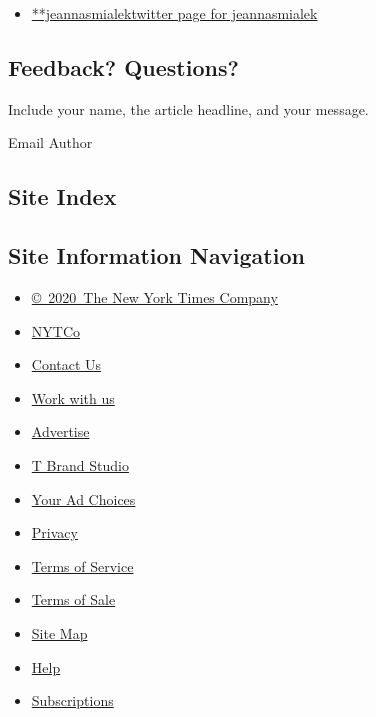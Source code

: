 \begin{itemize}
\tightlist
\item
  \href{https://twitter.com/jeannasmialek}{**jeannasmialektwitter page
  for jeannasmialek}
\end{itemize}

\hypertarget{feedback-questions}{%
\subsection{Feedback? Questions?}\label{feedback-questions}}

Include your name, the article headline, and your message.

Email Author

\hypertarget{site-index}{%
\subsection{Site Index}\label{site-index}}

\hypertarget{site-information-navigation}{%
\subsection{Site Information
Navigation}\label{site-information-navigation}}

\begin{itemize}
\tightlist
\item
  \href{https://help.nytimes3xbfgragh.onion/hc/en-us/articles/115014792127-Copyright-notice}{©~2020~The
  New York Times Company}
\end{itemize}

\begin{itemize}
\tightlist
\item
  \href{https://www.nytco.com/}{NYTCo}
\item
  \href{https://help.nytimes3xbfgragh.onion/hc/en-us/articles/115015385887-Contact-Us}{Contact
  Us}
\item
  \href{https://www.nytco.com/careers/}{Work with us}
\item
  \href{https://nytmediakit.com/}{Advertise}
\item
  \href{http://www.tbrandstudio.com/}{T Brand Studio}
\item
  \href{https://www.nytimes3xbfgragh.onion/privacy/cookie-policy\#how-do-i-manage-trackers}{Your
  Ad Choices}
\item
  \href{https://www.nytimes3xbfgragh.onion/privacy}{Privacy}
\item
  \href{https://help.nytimes3xbfgragh.onion/hc/en-us/articles/115014893428-Terms-of-service}{Terms
  of Service}
\item
  \href{https://help.nytimes3xbfgragh.onion/hc/en-us/articles/115014893968-Terms-of-sale}{Terms
  of Sale}
\item
  \href{https://spiderbites.nytimes3xbfgragh.onion}{Site Map}
\item
  \href{https://help.nytimes3xbfgragh.onion/hc/en-us}{Help}
\item
  \href{https://www.nytimes3xbfgragh.onion/subscription?campaignId=37WXW}{Subscriptions}
\end{itemize}
